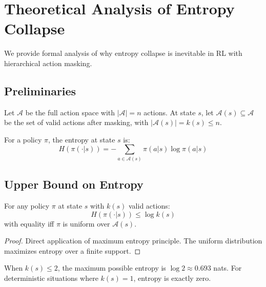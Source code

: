 
\section{Theoretical Analysis of Entropy Collapse}
\label{sec:entropy_theory}

We provide formal analysis of why entropy collapse is inevitable in RL with hierarchical action masking.

\subsection{Preliminaries}

Let $\mathcal{A}$ be the full action space with $|\mathcal{A}| = n$ actions. At state $s$, let $\mathcal{A}(s) \subseteq \mathcal{A}$ be the set of valid actions after masking, with $|\mathcal{A}(s)| = k(s) \leq n$.

For a policy $\pi$, the entropy at state $s$ is:
\begin{equation}
H(\pi(\cdot|s)) = -\sum_{a \in \mathcal{A}(s)} \pi(a|s) \log \pi(a|s)
\end{equation}

\subsection{Upper Bound on Entropy}

\begin{theorem}
\label{thm:entropy_bound}
For any policy $\pi$ at state $s$ with $k(s)$ valid actions:
\begin{equation}
H(\pi(\cdot|s)) \leq \log k(s)
\end{equation}
with equality iff $\pi$ is uniform over $\mathcal{A}(s)$.
\end{theorem}

\begin{proof}
Direct application of maximum entropy principle. The uniform distribution maximizes entropy over a finite support.
\end{proof}

\begin{corollary}
When $k(s) \leq 2$, the maximum possible entropy is $\log 2 \approx 0.693$ nats. For deterministic situations where $k(s) = 1$, entropy is exactly zero.
\end{corollary}


